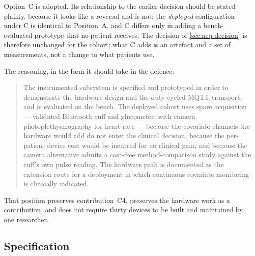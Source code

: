 \documentclass[12pt,a4paper,oneside]{report}
\begin{document}
Option~C is adopted. Its relationship to the earlier decision should be stated plainly, because it looks like a reversal and is not: the \emph{deployed} configuration under C is identical to Position~A, and C differs only in adding a bench-evaluated prototype that no patient receives. The decision of \cref{sec:acq-decision} is therefore unchanged for the cohort; what C adds is an artefact and a set of measurements, not a change to what patients use.

The reasoning, in the form it should take in the defence:

\begin{quote}
The instrumented subsystem is specified and prototyped in order to demonstrate the hardware design and the duty-cycled MQTT transport, and is evaluated on the bench. The deployed cohort uses spare acquisition --- validated Bluetooth cuff and glucometer, with camera photoplethysmography for heart rate --- because the covariate channels the hardware would add do not enter the clinical decision, because the per-patient device cost would be incurred for no clinical gain, and because the camera alternative admits a cost-free method-comparison study against the cuff's own pulse reading. The hardware path is documented as the extension route for a deployment in which continuous covariate monitoring is clinically indicated.
\end{quote}

That position preserves contribution~C4, preserves the hardware work as a contribution, and does not require thirty devices to be built and maintained by one researcher.

\subsection{Specification}\label{sec:spec42}
\end{document}
